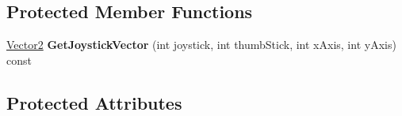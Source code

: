 \subsection*{Protected Member Functions}
\begin{DoxyCompactItemize}
\item 
\hypertarget{classCStickBindGroup_a911ca3a900666dc0545766c2f809d23b}{\hyperlink{structVector2}{Vector2} {\bfseries Get\-Joystick\-Vector} (int joystick, int thumb\-Stick, int x\-Axis, int y\-Axis) const }\label{classCStickBindGroup_a911ca3a900666dc0545766c2f809d23b}

\end{DoxyCompactItemize}
\subsection*{Protected Attributes}
